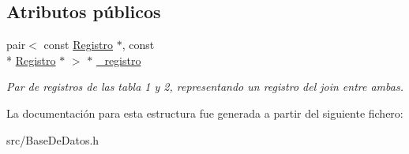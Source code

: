 \subsection*{Atributos públicos}
\begin{DoxyCompactItemize}
\item 
\hypertarget{structBaseDeDatos_1_1Join_1_1iterator_ab4d4ccfde30f66e4f2063adecfce45b3}{pair$<$ const \hyperlink{classRegistro}{Registro} $\ast$, const \\*
\hyperlink{classRegistro}{Registro} $\ast$ $>$ $\ast$ \hyperlink{structBaseDeDatos_1_1Join_1_1iterator_ab4d4ccfde30f66e4f2063adecfce45b3}{\-\_\-registro}}\label{structBaseDeDatos_1_1Join_1_1iterator_ab4d4ccfde30f66e4f2063adecfce45b3}

\begin{DoxyCompactList}\small\item\em Par de registros de las tabla 1 y 2, representando un registro del join entre ambas. \end{DoxyCompactList}\end{DoxyCompactItemize}


La documentación para esta estructura fue generada a partir del siguiente fichero\-:\begin{DoxyCompactItemize}
\item 
src/Base\-De\-Datos.\-h\end{DoxyCompactItemize}
